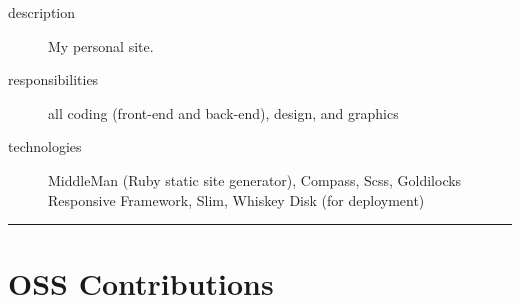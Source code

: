 \documentclass{article}
\begin{document}
\begin{multicols}{2}

\begin{description}
  \item[description] My personal site. 
  \item[responsibilities] all coding (front-end and back-end), design, and graphics 
  \item[technologies] MiddleMan (Ruby static site generator), Compass, Scss, Goldilocks Responsive Framework, Slim, Whiskey Disk (for deployment)
\end{description}

\vfill
\columnbreak
{}
\end{multicols}


\hrule
\section{OSS Contributions} %
\label{sec:OSS Contributions}
\end{document}
